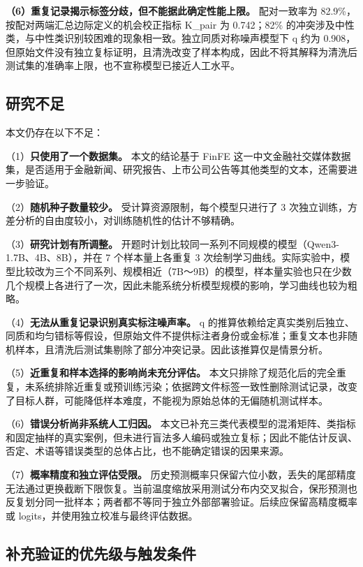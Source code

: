 \textbf{（6）重复记录揭示标签分歧，但不能据此确定性能上限。} 配对一致率为 82.9\%，按配对两端汇总边际定义的机会校正指标 K\_pair 为 0.742；82\% 的冲突涉及中性类，与中性类识别较困难的现象相一致。独立同质对称噪声模型下 q 约为 0.908，但原始文件没有独立复标证明，且清洗改变了样本构成，因此不将其解释为清洗后测试集的准确率上限，也不宣称模型已接近人工水平。

\FloatBarrier\subsection{研究不足}

本文仍存在以下不足：

（1）\textbf{只使用了一个数据集。} 本文的结论基于 FinFE 这一中文金融社交媒体数据集，是否适用于金融新闻、研究报告、上市公司公告等其他类型的文本，还需要进一步验证。

（2）\textbf{随机种子数量较少。} 受计算资源限制，每个模型只进行了 3 次独立训练，方差分析的自由度较小，对训练随机性的估计不够精确。

（3）\textbf{研究计划有所调整。} 开题时计划比较同一系列不同规模的模型（Qwen3-1.7B、4B、8B），并在 7 个样本量上各重复 3 次绘制学习曲线。实际实验中，模型比较改为三个不同系列、规模相近（7B～9B）的模型，样本量实验也只在少数几个规模上各进行了一次，因此未能系统分析模型规模的影响，学习曲线也较为粗略。

（4）\textbf{无法从重复记录识别真实标注噪声率。} q 的推算依赖给定真实类别后独立、同质和均匀错标等假设，但原始文件不提供标注者身份或金标准；重复文本也非随机样本，且清洗后测试集剔除了部分冲突记录。因此该推算仅是情景分析。

（5）\textbf{近重复和样本选择的影响尚未充分评估。} 本文只排除了规范化后的完全重复，未系统排除近重复或预训练污染；依据跨文件标签一致性删除测试记录，改变了目标人群，可能降低样本难度，不能视为原始总体的无偏随机测试样本。

（6）\textbf{错误分析尚非系统人工归因。} 本文已补充三类代表模型的混淆矩阵、类指标和固定抽样的真实案例，但未进行盲法多人编码或独立复标；因此不能估计反讽、否定、术语等错误类型的总体占比，也不能确定错误的因果来源。

（7）\textbf{概率精度和独立评估受限。} 历史预测概率只保留六位小数，丢失的尾部精度无法通过更换截断下限恢复。当前温度缩放采用测试分布内交叉拟合，保形预测也反复划分同一批样本；两者都不等同于独立外部部署验证。后续应保留高精度概率或 logits，并使用独立校准与最终评估数据。

\FloatBarrier\subsection{补充验证的优先级与触发条件}

